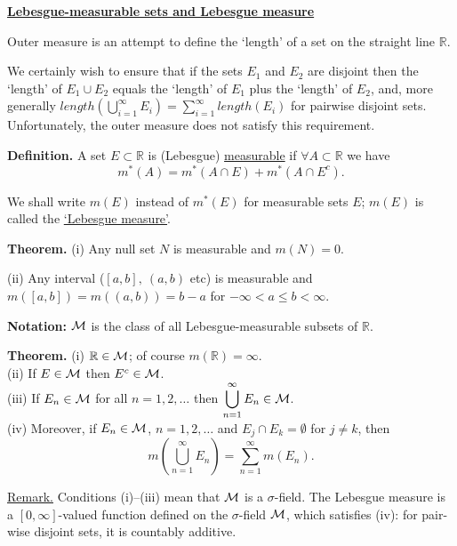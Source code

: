 \documentclass[a4paper,10pt]{article}
\def\RR{\mathbb{R}}
\newcommand{\1}[1]{\mathbf{1}_{\{#1\}}}
\begin{document}
\begin{center}\bf\underline{Lebesgue-measurable sets and Lebesgue measure} \end{center}\vspace{3mm}

Outer measure is an attempt to define the `length' of a set on the straight line $\RR$.

We certainly wish to ensure that if the sets $E_1$ and $E_2$ are disjoint then the `length' of $E_1\cup E_2$ equals the `length' of $E_1$ plus the `length' of $E_2$, and, more generally $length\left(\bigcup_{i=1}^\infty E_i\right)=\sum_{i=1}^\infty length(E_i)$ for pairwise disjoint sets. Unfortunately, the outer measure does not satisfy this requirement.\vspace{3mm}

{\bf Definition.} A set $E\subset\RR$ is (Lebesgue) \underline{measurable} if $\forall A\subset\RR$ we have
  $$m^*(A)=m^*(A\cap E)+m^*(A\cap E^c).$$

We shall write $m(E)$ instead of $m^*(E)$ for measurable sets $E$; $m(E)$ is called the \underline{`Lebesgue measure'}. \vspace{3mm}

{\bf Theorem.} (i) Any null set $N$ is measurable and $m(N)=0$.

(ii) Any interval ($[a,b],~(a,b)$ etc) is measurable and $m([a,b])=m((a,b))=b-a$ for $-\infty<a\le b<\infty$. \vspace{3mm}

{\bf Notation:} $\cal M$ is the class of all Lebesgue-measurable subsets of $\RR$. \vspace{3mm}

{\bf Theorem.} (i) $\RR\in{\cal M}$; of course $m(\RR)=\infty$.\\
(ii) If $E\in{\cal M}$ then $E^c\in{\cal M}$.\\
(iii) If $E_n\in{\cal M}$ for all $n=1,2,\ldots$ then $\displaystyle\bigcup_{n=1}^\infty E_n\in{\cal M}$.\\
(iv) Moreover, if $E_n\in{\cal M}$, $n=1,2,\ldots$ and $E_j\cap E_k=\emptyset$ for $j\ne k$, then
  $$m(\bigcup_{n=1}^\infty E_n)=\sum_{n=1}^\infty m(E_n).$$\vspace{3mm}

\underline{Remark.} Conditions (i)--(iii) mean that $\cal M$ is a $\sigma$-field. The Lebesgue measure is a $[0,\infty]$-valued function defined on the $\sigma$-field $\cal M$, which satisfies (iv): for pair-wise disjoint sets, it is countably additive.\vspace{3mm}
\end{document}
